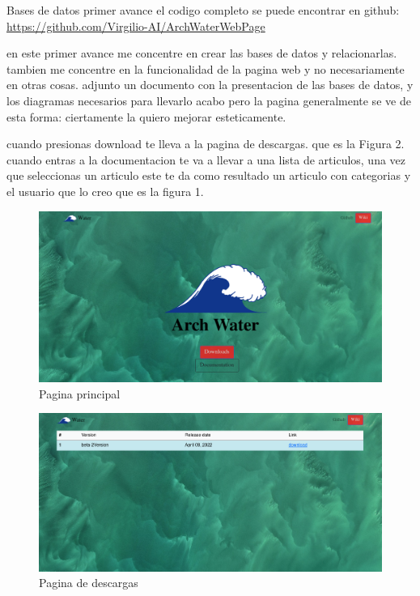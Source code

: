 \documentclass[15pt]{extarticle}
\begin{document}
\begin{section}{Bases de datos primer avance}
	el codigo completo se puede encontrar en github:
	\url{https://github.com/Virgilio-AI/ArchWaterWebPage}


	en este primer avance me concentre en crear las bases de datos y relacionarlas. tambien me concentre en la funcionalidad de la pagina web y no necesariamente en otras cosas.
	adjunto un documento con la presentacion de las bases de datos, y los diagramas necesarios para llevarlo acabo
	pero la pagina generalmente se ve de esta forma:
	ciertamente la quiero mejorar esteticamente.

	cuando presionas download te lleva a la pagina de descargas.
	que es la Figura 2.
	cuando entras a la documentacion te va a llevar a una lista de articulos, una vez que seleccionas un articulo este te da como resultado un articulo con categorias y el usuario que lo creo
	que es la figura 1.



	\begin{figure}[h]
		\begin{center}
			\includegraphics[scale=0.4]{img_presentation/mainPage.png}
			\caption{Pagina principal}
		\end{center}
	\end{figure}


	\begin{figure}[h]
		\begin{center}
			\includegraphics[scale=0.4]{img_presentation/PaginaDeDescargas.png}
			\caption{Pagina de descargas}
		\end{center}
	\end{figure}


\end{section}
\end{document}
